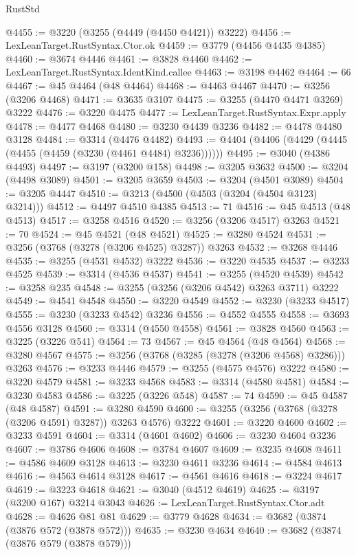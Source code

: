 \begin{lexlean}{RustStd}
\begin{coremodule}
@4455 := @3220 (@3255 (@4449 (@4450 @4421)) @3222)
@4456 := LexLeanTarget.RustSyntax.Ctor.ok
@4459 := @3779 (@4456 @4435 @4385)
@4460 := @3674 @4446
@4461 := @3828 @4460
@4462 := LexLeanTarget.RustSyntax.IdentKind.callee
@4463 := @3198 @4462
@4464 := 66
@4467 := @45 @4464 (@48 @4464)
@4468 := @4463 @4467
@4470 := @3256 (@3206 @4468)
@4471 := @3635 @3107
@4475 := @3255 (@4470 @4471 @3269) @3222
@4476 := @3220 @4475
@4477 := LexLeanTarget.RustSyntax.Expr.apply
@4478 := @4477 @4468
@4480 := @3230 @4439 @3236
@4482 := @4478 @4480 @3128
@4484 := @3314 (@4476 @4482)
@4493 := @4404 (@4406 (@4429 (@4445 (@4455 (@4459 (@3230 (@4461 @4484) @3236))))))
@4495 := @3040 (@4386 @4493)
@4497 := @3197 (@3200 @158)
@4498 := @3205 @3632
@4500 := @3204 (@4498 @3089)
@4501 := @3205 @3659
@4503 := @3204 (@4501 @3089)
@4504 := @3205 @4447
@4510 := @3213 (@4500 (@4503 (@3204 (@4504 @3123) @3214)))
@4512 := @4497 @4510 @4385
@4513 := 71
@4516 := @45 @4513 (@48 @4513)
@4517 := @3258 @4516
@4520 := @3256 (@3206 @4517) @3263
@4521 := 70
@4524 := @45 @4521 (@48 @4521)
@4525 := @3280 @4524
@4531 := @3256 (@3768 (@3278 (@3206 @4525) @3287)) @3263
@4532 := @3268 @4446
@4535 := @3255 (@4531 @4532) @3222
@4536 := @3220 @4535
@4537 := @3233 @4525
@4539 := @3314 (@4536 @4537)
@4541 := @3255 (@4520 @4539)
@4542 := @3258 @235
@4548 := @3255 (@3256 (@3206 @4542) @3263 @3711) @3222
@4549 := @4541 @4548
@4550 := @3220 @4549
@4552 := @3230 (@3233 @4517)
@4555 := @3230 (@3233 @4542) @3236
@4556 := @4552 @4555
@4558 := @3693 @4556 @3128
@4560 := @3314 (@4550 @4558)
@4561 := @3828 @4560
@4563 := @3225 (@3226 @541)
@4564 := 73
@4567 := @45 @4564 (@48 @4564)
@4568 := @3280 @4567
@4575 := @3256 (@3768 (@3285 (@3278 (@3206 @4568) @3286))) @3263
@4576 := @3233 @4446
@4579 := @3255 (@4575 @4576) @3222
@4580 := @3220 @4579
@4581 := @3233 @4568
@4583 := @3314 (@4580 @4581)
@4584 := @3230 @4583
@4586 := @3225 (@3226 @548)
@4587 := 74
@4590 := @45 @4587 (@48 @4587)
@4591 := @3280 @4590
@4600 := @3255 (@3256 (@3768 (@3278 (@3206 @4591) @3287)) @3263 @4576) @3222
@4601 := @3220 @4600
@4602 := @3233 @4591
@4604 := @3314 (@4601 @4602)
@4606 := @3230 @4604 @3236
@4607 := @3786 @4606
@4608 := @3784 @4607
@4609 := @3235 @4608
@4611 := @4586 @4609 @3128
@4613 := @3230 @4611 @3236
@4614 := @4584 @4613
@4616 := @4563 @4614 @3128
@4617 := @4561 @4616
@4618 := @3224 @4617
@4619 := @3223 @4618
@4621 := @3040 (@4512 @4619)
@4625 := @3197 (@3200 @167) @3214 @3043
@4626 := LexLeanTarget.RustSyntax.Ctor.adt
@4628 := @4626 @81 @81
@4629 := @3779 @4628
@4634 := @3682 (@3874 (@3876 @572 (@3878 @572)))
@4635 := @3230 @4634
@4640 := @3682 (@3874 (@3876 @579 (@3878 @579)))

\end{coremodule}
\end{lexlean}
